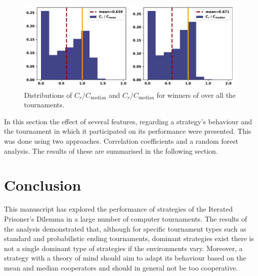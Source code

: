 \documentclass{article}
\newcommand{\numberofstrategies}{}
\begin{document}
\begin{figure}[!htbp]
    \centering
    \includegraphics[width=.5\textwidth]{../images/compared_to_mean_median_overall.pdf}
    \caption{Distributions of \(C_r / C_{\text{median}}\)
    and \(C_r / C_{\text{median}}\) for winners of over all the tournaments.}\label{fig:mean_median_overall}
\end{figure}

In this section the effect of several features, regarding a strategy's behaviour
and the tournament in which it participated on its performance were presented.
This was done using two approaches. Correlation coefficients and a random forest
analysis. The results of these are summarised in the following section.

\section{Conclusion}\label{section:conclusion}

This manuscript has explored the performance of \numberofstrategies strategies of the Iterated
Prisoner's Dilemma in a large number of computer tournaments. The results of
the analysis demonstrated that, although for specific tournament types such as
standard and probabilistic ending tournaments, dominant strategies exist
there is not a single dominant type of strategies if the environments
vary. Moreover, a strategy with a theory of mind should aim to adapt its behaviour
based on the mean and median cooperators and should in general not be too
cooperative.
\end{document}
